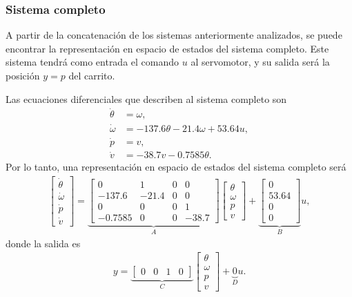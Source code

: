 \subsubsection{Sistema completo}

A partir de la concatenación de los sistemas anteriormente analizados, se puede encontrar la representación en espacio de estados del sistema completo. Este sistema tendrá como entrada el comando $u$ al servomotor, y su salida será la posición $y = p$ del carrito.

Las ecuaciones diferenciales que describen al sistema completo son
\begin{align*}
    \dot{\theta} &= \omega, \\
    \dot{\omega} &= -137.6 \theta - 21.4 \omega + 53.64 u, \\
    \dot{p} &= v, \\
    \dot{v} &= -38.7 v - 0.7585 \theta.
\end{align*}
Por lo tanto, una representación en espacio de estados del sistema completo será
\begin{align*}
    \begin{bmatrix} \dot{\theta} \\ \dot{\omega} \\ \dot{p} \\ \dot{v} \end{bmatrix} =
        \underbrace{\begin{bmatrix}
            0 & 1 & 0 & 0 \\
            -137.6 & -21.4 & 0 & 0\\
            0 & 0 & 0 & 1 \\
            -0.7585 & 0 & 0 & -38.7
        \end{bmatrix}}_{A} \begin{bmatrix} \theta \\ \omega \\ p \\ v \end{bmatrix}
            + \underbrace{\begin{bmatrix} 0 \\ 53.64 \\ 0 \\ 0 \end{bmatrix}}_{B} u,
\end{align*}
donde la salida es
\begin{align*}
    y = \underbrace{\begin{bmatrix} 0 & 0 & 1 & 0 \end{bmatrix}}_{C} \begin{bmatrix} \theta \\ \omega \\p \\ v \end{bmatrix} + \underbrace{0}_{D} u.
\end{align*}

